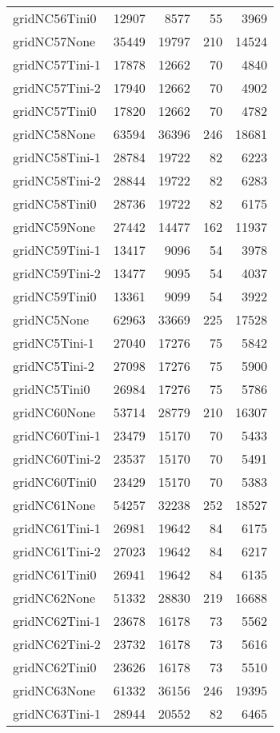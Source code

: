 \begin{longtable}{lrrrr}
gridNC56Tini0 & 12907 & 8577 & 55 & 3969 \\
gridNC57None & 35449 & 19797 & 210 & 14524 \\
gridNC57Tini-1 & 17878 & 12662 & 70 & 4840 \\
gridNC57Tini-2 & 17940 & 12662 & 70 & 4902 \\
gridNC57Tini0 & 17820 & 12662 & 70 & 4782 \\
gridNC58None & 63594 & 36396 & 246 & 18681 \\
gridNC58Tini-1 & 28784 & 19722 & 82 & 6223 \\
gridNC58Tini-2 & 28844 & 19722 & 82 & 6283 \\
gridNC58Tini0 & 28736 & 19722 & 82 & 6175 \\
gridNC59None & 27442 & 14477 & 162 & 11937 \\
gridNC59Tini-1 & 13417 & 9096 & 54 & 3978 \\
gridNC59Tini-2 & 13477 & 9095 & 54 & 4037 \\
gridNC59Tini0 & 13361 & 9099 & 54 & 3922 \\
gridNC5None & 62963 & 33669 & 225 & 17528 \\
gridNC5Tini-1 & 27040 & 17276 & 75 & 5842 \\
gridNC5Tini-2 & 27098 & 17276 & 75 & 5900 \\
gridNC5Tini0 & 26984 & 17276 & 75 & 5786 \\
gridNC60None & 53714 & 28779 & 210 & 16307 \\
gridNC60Tini-1 & 23479 & 15170 & 70 & 5433 \\
gridNC60Tini-2 & 23537 & 15170 & 70 & 5491 \\
gridNC60Tini0 & 23429 & 15170 & 70 & 5383 \\
gridNC61None & 54257 & 32238 & 252 & 18527 \\
gridNC61Tini-1 & 26981 & 19642 & 84 & 6175 \\
gridNC61Tini-2 & 27023 & 19642 & 84 & 6217 \\
gridNC61Tini0 & 26941 & 19642 & 84 & 6135 \\
gridNC62None & 51332 & 28830 & 219 & 16688 \\
gridNC62Tini-1 & 23678 & 16178 & 73 & 5562 \\
gridNC62Tini-2 & 23732 & 16178 & 73 & 5616 \\
gridNC62Tini0 & 23626 & 16178 & 73 & 5510 \\
gridNC63None & 61332 & 36156 & 246 & 19395 \\
gridNC63Tini-1 & 28944 & 20552 & 82 & 6465 \\

\end{longtable}
